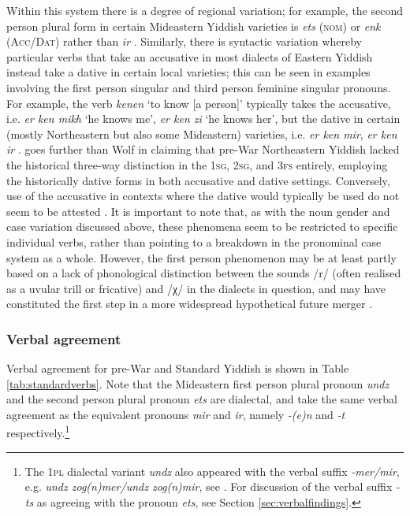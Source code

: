 \documentclass[output=paper, hidelinks]{langscibook}
\begin{document}
Within this system there is a degree of regional variation; for example, the second person plural form in certain Mideastern Yiddish varieties is \textit{ets} (\textsc{nom}) or \textit{enk} (\textsc{Acc/Dat}) rather than \textit{ir} \citep[70]{Jacobs05}. Similarly, there is syntactic variation whereby particular verbs that take an accusative in most dialects of Eastern Yiddish instead take a dative in certain local varieties; this can be seen in examples involving the first person singular and third person feminine singular pronouns. For example, the verb \textit{kenen} ‘to know [a person]’ typically takes the accusative, i.e. \textit{er ken mikh} `he knows me’, \textit{er ken zi} `he knows her’, but the dative in certain (mostly Northeastern but also some Mideastern) varieties, i.e. \textit{er ken mir}, \textit{er ken ir} \citep[142--147]{Wolf69}. \citet[184]{Jacobs05} goes further than Wolf in claiming that pre-War Northeastern Yiddish lacked the historical three-way distinction in the 1\textsc{sg}, 2\textsc{sg}, and 3\textsc{fs} entirely, employing the historically dative forms in both accusative and dative settings. Conversely, use of the accusative in contexts where the dative would typically be used do not seem to be attested \citep[142--146]{Wolf69}. It is important to note that, as with the noun gender and case variation discussed above, these phenomena seem to be restricted to specific individual verbs, rather than pointing to a breakdown in the pronominal case system as a whole. However, the first person phenomenon may be at least partly based on a lack of phonological distinction between the sounds /r/ (often realised as a uvular trill or fricative) and /χ/ in the dialects in question, and may have constituted the first step in a more widespread hypothetical future merger \citep[149]{Wolf69}.



\subsubsection{Verbal agreement}

Verbal agreement for pre-War and Standard Yiddish is shown in Table \ref{tab:standardverbs}. Note that the Mideastern first person plural pronoun \textit{undz} and the second person plural pronoun \textit{ets} are dialectal, and take the same verbal agreement as the equivalent pronouns \textit{mir} and \textit{ir}, namely \textit{-(e)n} and \textit{-t} respectively.\footnote{The 1\textsc{pl} dialectal variant \textit{undz} also appeared with the verbal suffix \textit{-mer/mir}, e.g. \textit{undz zog(n)mer/undz zog(n)mir}, see \citet[70, 189]{Jacobs05}. For discussion of the verbal suffix \textit{-ts} as agreeing with the pronoun \textit{ets}, see Section \ref{sec:verbalfindings}.} 
\end{document}
